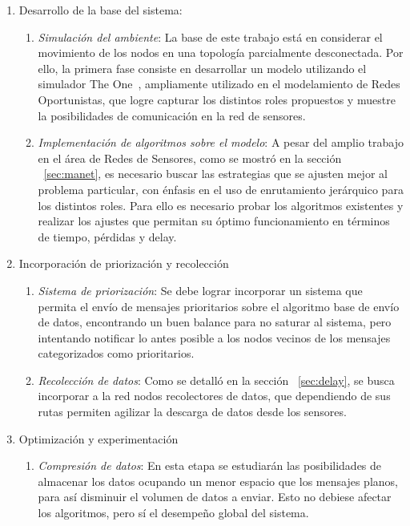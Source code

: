 \documentclass[10pt,preprint,onecolumn]{paper}
\begin{document}
\begin{enumerate}
\item Desarrollo de la base del sistema:
    \begin{enumerate}
	\item \emph{Simulación del ambiente}: La base de este trabajo está en considerar el movimiento de los nodos en una topología parcialmente desconectada. Por ello, la primera fase consiste en desarrollar un modelo utilizando el simulador The One~\cite{theone}, ampliamente utilizado en el modelamiento de Redes Oportunistas, que logre capturar los distintos roles propuestos y muestre la posibilidades de comunicación en la red de sensores.
	
	\item \emph{Implementación de algoritmos sobre el modelo}: A pesar del amplio trabajo en el área de Redes de Sensores, como se mostró en la sección ~\ref{sec:manet}, es necesario buscar las estrategias que se ajusten mejor al problema particular, con énfasis en el uso de enrutamiento jerárquico para los distintos roles. Para ello es necesario probar los algoritmos existentes y realizar los ajustes que permitan su óptimo funcionamiento en términos de tiempo, pérdidas y delay.
	
\end{enumerate}
\item Incorporación de priorización y recolección
\begin{enumerate}

	\item \emph{Sistema de priorización}: Se debe lograr incorporar un sistema que permita el envío de mensajes prioritarios sobre el algoritmo base de envío de datos, encontrando un buen balance para no saturar al sistema, pero intentando notificar lo antes posible a los nodos vecinos de los mensajes categorizados como prioritarios.

	\item \emph{Recolección de datos}: Como se detalló en la sección ~\ref{sec:delay}, se busca incorporar a la red nodos recolectores de datos, que dependiendo de sus rutas permiten agilizar la descarga de datos desde los sensores.
	
	\end{enumerate}
\item Optimización y experimentación
    \begin{enumerate}
    
	\item \emph{Compresión de datos}: En esta etapa se estudiarán las posibilidades de almacenar los datos ocupando un menor espacio que los mensajes planos, para así disminuir el volumen de datos a enviar. Esto no debiese afectar los algoritmos, pero sí el desempeño global del sistema.
	

\end{enumerate}
\end{enumerate}
\end{document}
